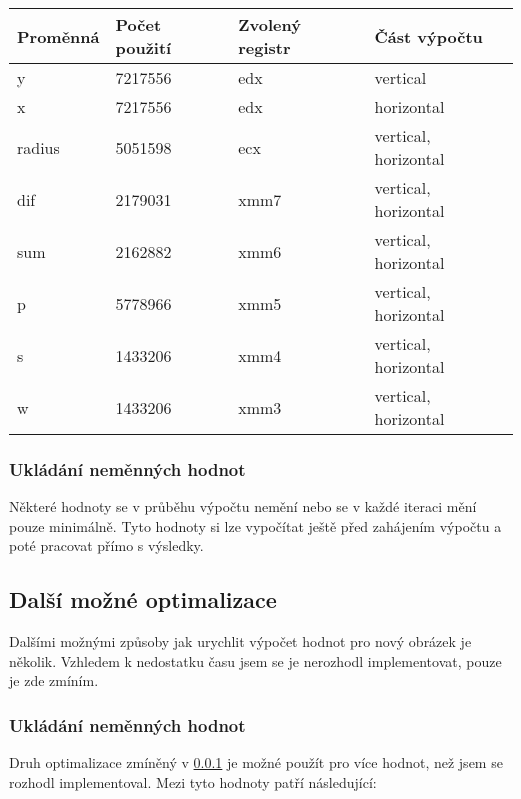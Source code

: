 \documentclass[12pt,a4paper,titlepage,final]{article}
\begin{document}
			\begin{center}
			    \begin{tabular}{ | l | l | l | l |}
			    \hline
			    Proměnná & Počet použití & Zvolený registr & Část výpočtu \\ \hline
			    y & 7217556 & edx & vertical \\ \hline
			    x & 7217556 & edx & horizontal \\ \hline
			    radius & 5051598 & ecx & vertical, horizontal \\ \hline
			    dif & 2179031 & xmm7 & vertical, horizontal \\ \hline
			    sum & 2162882 & xmm6 & vertical, horizontal \\ \hline
			    p & 5778966 & xmm5 & vertical, horizontal \\ \hline
			    s & 1433206 & xmm4 & vertical, horizontal \\ \hline
			    w & 1433206 & xmm3 & vertical, horizontal \\ \hline
			    \end{tabular}
			\end{center}

		\subsubsection{Ukládání neměnných hodnot} \label{static}
			Některé hodnoty se v průběhu výpočtu nemění nebo se v každé iteraci mění pouze minimálně.
			Tyto hodnoty si lze vypočítat ještě před zahájením výpočtu a poté pracovat přímo s výsledky.

	\subsection{Další možné optimalizace}
		Dalšími možnými způsoby jak urychlit výpočet hodnot pro nový obrázek je několik.
		Vzhledem k nedostatku času jsem se je nerozhodl implementovat, pouze je zde zmíním.

		\subsubsection{Ukládání neměnných hodnot}
			Druh optimalizace zmíněný v \ref{static} je možné použít pro více hodnot,
			než jsem se rozhodl implementoval.
			Mezi tyto hodnoty patří následující:
\end{document}
